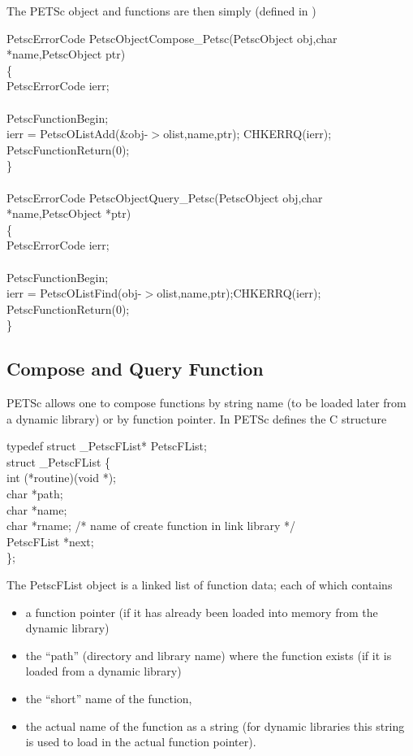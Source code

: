 \documentclass[twoside,12pt]{../sty/report_petsc}
\begin{document}
The PETSc object  and  functions are then simply
(defined in )
\begin{tabbing}
  PetscErrorCode PetscObjectCompose\_Petsc(PetscObject obj,char *name,PetscObject ptr)\\
  \{\\
    PetscErrorCode ierr;\\
\\
    PetscFunctionBegin;\\
    ierr = PetscOListAdd(\&obj-$>$olist,name,ptr); CHKERRQ(ierr);\\
    PetscFunctionReturn(0);\\
  \}\\
\\
  PetscErrorCode PetscObjectQuery\_Petsc(PetscObject obj,char *name,PetscObject *ptr)\\
  \{\\
    PetscErrorCode ierr;\\
\\
    PetscFunctionBegin;\\
    ierr = PetscOListFind(obj-$>$olist,name,ptr);CHKERRQ(ierr);\\
    PetscFunctionReturn(0); \\
  \}
\end{tabbing}

\subsection{Compose and Query Function}

PETSc allows one to compose functions by string name (to be loaded later from 
a dynamic library) or by function pointer. In 
PETSc defines the C structure

\begin{tabbing}
typedef struct \_PetscFList* PetscFList;\\
struct \_PetscFList \{\\
  int    (*routine)(void *);\\
  char   *path;\\
  char   *name;  \\             
  char   *rname;            /* name of create function in link library */\\
  PetscFList  *next;\\
\};
\end{tabbing}

The PetscFList object is a linked list of function data; each 
of which contains
\begin{itemize}
\item a function pointer (if it has already been loaded into memory from the dynamic library)
\item the ``path'' (directory and library name) where the function exists (if it is 
      loaded from a dynamic library)
\item the ``short'' name of the function,
\item the actual name of the function as a string (for dynamic libraries this string is used
      to load in the actual function pointer).
\end{itemize}
\end{document}
